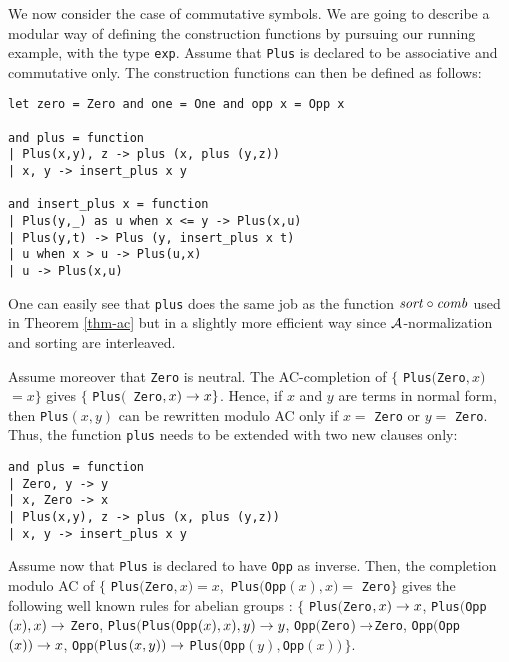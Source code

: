 
We now consider the case of commutative symbols. We are going to
describe a modular way of defining the construction functions by
pursuing our running  example, with the type {\tt exp}. 
Assume that {\tt Plus} is declared to be associative
and commutative only. The construction functions can then be defined
as follows:

{\small\begin{verbatim}
let zero = Zero and one = One and opp x = Opp x

and plus = function
| Plus(x,y), z -> plus (x, plus (y,z))
| x, y -> insert_plus x y

and insert_plus x = function
| Plus(y,_) as u when x <= y -> Plus(x,u)
| Plus(y,t) -> Plus (y, insert_plus x t)
| u when x > u -> Plus(u,x)
| u -> Plus(x,u)
\end{verbatim}}

One can easily see that {\tt plus} does the same job as the function
$\mathit{sort}\circ\mathit{comb}$ used in Theorem \ref{thm-ac} but in a slightly more
efficient way since $\mathcal{A}$-normalization and sorting are interleaved.


Assume moreover that {\tt Zero} is neutral. The AC-completion of
$\{$ {\tt Plus}$(${\tt Zero}$,x)$ $=x\}$ gives $\{$ {\tt Plus}$(${\tt
Zero}$,x)\rightarrow x\}$. Hence, if $x$ and $y$ are terms in normal form, then
{\tt Plus}$(x,y)$ can be rewritten modulo AC only if $x=$ {\tt Zero}
or $y= $ {\tt Zero}. Thus, the function {\tt plus} needs to be
extended with two new clauses only:

{\small\begin{verbatim}
and plus = function
| Zero, y -> y
| x, Zero -> x
| Plus(x,y), z -> plus (x, plus (y,z))
| x, y -> insert_plus x y
\end{verbatim}}


Assume now that {\tt Plus} is declared to have {\tt Opp} as
inverse. Then, the completion modulo AC of
$\{$ {\tt Plus}$(${\tt Zero}$,x)=x,$
{\tt Plus}$(${\tt Opp}$(x),x)=$ {\tt Zero}$\}$ 
gives the following well known rules for
abelian groups \cite{hullot80thesis}: 
$\{$ {\tt Plus}$(${\tt Zero}$,x)\rightarrow x$,\quad
{\tt Plus}$(${\tt Opp}$(x),x)\rightarrow $ {\tt Zero},\quad
{\tt Plus}$(${\tt Plus}$(${\tt Opp}$(x),x),y)\rightarrow y$,\quad
{\tt Opp}$(${\tt Zero}$)\rightarrow${\tt Zero},\quad
{\tt Opp}$(${\tt Opp}$(x))\rightarrow x$,\quad
{\tt Opp}$(${\tt Plus}$(x,y))\rightarrow$
{\tt Plus}$(${\tt Opp}$(y),${\tt Opp}$(x))\,\}$.

